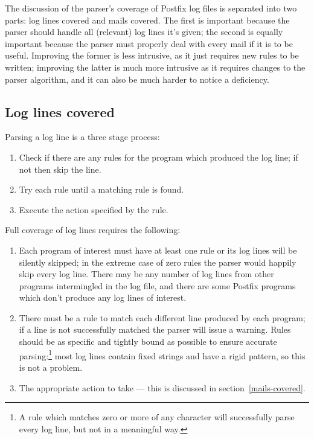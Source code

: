 \documentclass[a4paper,12pt,draft]{article}
\begin{document}
The discussion of the parser's coverage of Postfix log files is separated
into two parts: log lines covered and mails covered.  The first is
important because the parser should handle all (relevant) log lines it's
given; the second is equally important because the parser must properly
deal with every mail if it is to be useful.  Improving the former is
less intrusive, as it just requires new rules to be written; improving the
latter is much more intrusive as it requires changes to the parser
algorithm, and it can also be much harder to notice a deficiency.

\subsection{Log lines covered}

\label{log-lines-covered}

Parsing a log line is a three stage process:

\begin{enumerate}

    \item Check if there are any rules for the program which produced the
        log line; if not then skip the line.  

    \item Try each rule until a matching rule is found.

    \item Execute the action specified by the rule.

\end{enumerate}

Full coverage of log lines requires the following:

\begin{enumerate}

    \item Each program of interest must have at least one rule or its log
        lines will be silently skipped; in the extreme case of zero rules
        the parser would happily skip every log line.  There may be any
        number of log lines from other programs intermingled in the log
        file, and there are some Postfix programs which don't produce any
        log lines of interest.

    \item There must be a rule to match each different line produced by
        each program; if a line is not successfully matched the parser will
        issue a warning.  Rules should be as specific and tightly bound as
        possible to ensure accurate parsing:\footnote{A rule which matches
        zero or more of any character will successfully parse every log
        line, but not in a meaningful way.} most log lines contain fixed
        strings and have a rigid pattern, so this is not a problem.

    \item The appropriate action to take --- this is discussed in
        section~\ref{mails-covered}.

\end{enumerate}
\end{document}
